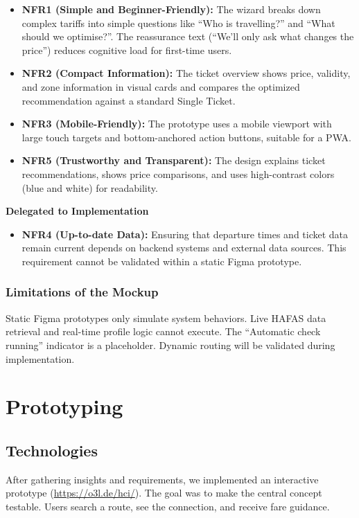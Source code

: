 \documentclass[12pt,a4paper]{article}
\newcommand{\minorheading}[1]{%
    \vspace{0.75em}%
    \noindent\textbf{#1}\par
    \vspace{0.25em}%
}
\begin{document}
\begin{itemize}
    \item \textbf{NFR1 (Simple and Beginner-Friendly):}  
    The wizard breaks down complex tariffs into simple questions like ``Who is travelling?'' and ``What should we optimise?''. The reassurance text (``We'll only ask what changes the price'') reduces cognitive load for first-time users.

    \item \textbf{NFR2 (Compact Information):}  
    The ticket overview shows price, validity, and zone information in visual cards and compares the optimized recommendation against a standard Single Ticket.

    \item \textbf{NFR3 (Mobile-Friendly):}  
    The prototype uses a mobile viewport with large touch targets and bottom-anchored action buttons, suitable for a PWA.

    \item \textbf{NFR5 (Trustworthy and Transparent):}  
    The design explains ticket recommendations, shows price comparisons, and uses high-contrast colors (blue and white) for readability.
\end{itemize}

\minorheading{Delegated to Implementation}

\begin{itemize}
    \item \textbf{NFR4 (Up-to-date Data):}  
    Ensuring that departure times and ticket data remain current depends on backend systems and external data sources. This requirement cannot be validated within a static Figma prototype.
\end{itemize}

\subsubsection{Limitations of the Mockup}

Static Figma prototypes only simulate system behaviors. Live HAFAS data retrieval and real-time profile logic cannot execute. The ``Automatic check running'' indicator is a placeholder. Dynamic routing will be validated during implementation.


\section{Prototyping}
\subsection{Technologies}
After gathering insights and requirements, we implemented an interactive prototype (\url{https://o3l.de/hci/}). The goal was to make the central concept testable. Users search a route, see the connection, and receive fare guidance.
\end{document}
